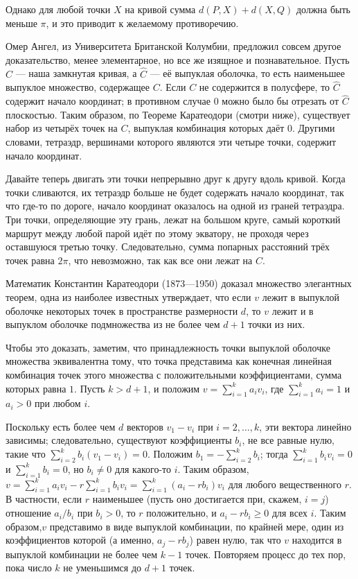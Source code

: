 Однако для любой точки $X$ на кривой сумма $d(P, X) + d(X, Q)$ должна быть меньше $\pi$, и это приводит к желаемому противоречию.

Омер Ангел, из Университета Британской Колумбии,
предложил совсем другое доказательство,
менее элементарное, но все же изящное и познавательное.
Пусть $C$ --- наша замкнутая кривая, а $\hat C$ --- её выпуклая оболочка, то есть наименьшее выпуклое множество, содержащее $C$.
Если $C$ не содержится в полусфере, то $\hat C$ содержит начало координат;
в противном случае $0$ можно было бы отрезать от $\hat C$ плоскостью.
Таким образом, по Теореме Каратеодори (смотри ниже), существует набор из четырёх точек на $C$, выпуклая комбинация которых даёт $0$.
Другими словами, тетраэдр, вершинами которого являются эти четыре точки, содержит начало координат.

Давайте теперь двигать эти точки непрерывно друг к другу вдоль кривой.
Когда точки сливаются, их тетраэдр больше не будет содержать начало координат, так что где-то по дороге, начало координат оказалось на одной из граней тетраэдра.
Три точки, определяющие эту грань, лежат на большом круге, самый короткий маршрут между любой парой идёт по этому экватору, не проходя через оставшуюся третью точку.
Следовательно, сумма попарных расстояний трёх точек равна $2\pi$, что невозможно, так как все они лежат на $C$.

Математик Константин Каратеодори (1873---1950) доказал множество элегантных теорем, одна из наиболее известных утверждает, что если $v$ лежит в выпуклой оболочке некоторых точек в пространстве размерности $d$, то $v$ лежит и в выпуклом оболочке подмножества из не более чем $d+1$ точки из них.

Чтобы это доказать, заметим, что принадлежность точки выпуклой оболочке множества
эквивалентна тому, что точка представима как конечная линейная комбинация точек этого множества с положительными коэффициентами, сумма которых равна $1$.
Пусть $k>d+1$, и положим $v=\sum_{i=1}^k a_iv_i$, где $\sum_{i=1}^k a_i=1$ и $a_i>0$ при любом $i$.

Поскольку есть более чем $d$ векторов $v_1-v_i$ при $i=2,\dots,k$, эти вектора линейно зависимы;
следовательно, существуют коэффициенты $b_i$, не все равные нулю, такие что $\sum_{i=2}^k b_i(v_1-v_i)=0$.
Положим $b_1=-\sum_{i=2}^k b_i$; тогда $\sum_{i=1}^k b_i v_i=0$ и $\sum_{i=1}^k b_i=0$, но $b_i\ne 0$ для какого-то $i$.
Таким образом, $v=\sum_{i=1}^k a_iv_i-r\sum_{i=1}^k b_iv_i=\sum_{i=1}^k (a_i-rb_i)v_i$ для любого вещественного $r$.
В частности, если $r$ наименьшее (пусть оно достигается при, скажем, $i=j$) отношение $a_i/b_i$  при $b_i>0$, то $r$ положительно, и $a_i-rb_i\ge0$ для всех $i$.
Таким образом,$v$ представимо в виде выпуклой комбинации, по крайней мере, один из коэффициентов которой (а именно, $a_j-rb_j$) равен нулю, так что $v$ находится в выпуклой комбинации не более чем $k-1$ точек.
Повторяем процесс до тех пор, пока число $k$ не уменьшимся до $d+1$ точек.

